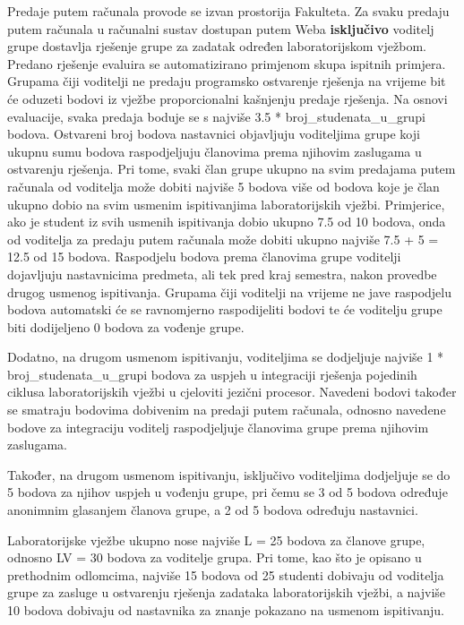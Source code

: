 \documentclass[times, 12pt, utf8]{book}
\begin{document}
Predaje putem računala provode se izvan prostorija Fakulteta.
Za svaku predaju putem računala u računalni sustav dostupan putem Weba \textbf{isključivo} voditelj grupe dostavlja rješenje grupe za zadatak određen laboratorijskom vježbom.
Predano rješenje evaluira se automatizirano primjenom skupa ispitnih primjera.
Grupama čiji voditelji ne predaju programsko ostvarenje rješenja na vrijeme bit će oduzeti bodovi iz vježbe proporcionalni kašnjenju predaje rješenja.
Na osnovi evaluacije, svaka predaja boduje se s najviše 3.5 * broj\_studenata\_u\_grupi bodova.
Ostvareni broj bodova nastavnici objavljuju voditeljima grupe koji ukupnu sumu bodova raspodjeljuju članovima prema njihovim zaslugama u ostvarenju rješenja.
Pri tome, svaki član grupe ukupno na svim predajama putem računala od voditelja može dobiti najviše 5 bodova više od bodova koje je član ukupno dobio na svim usmenim ispitivanjima laboratorijskih vježbi.
Primjerice, ako je student iz svih usmenih ispitivanja dobio ukupno 7.5 od 10 bodova, onda od voditelja za predaju putem računala može dobiti ukupno najviše 7.5 + 5 = 12.5 od 15 bodova. 
Raspodjelu bodova prema članovima grupe voditelji dojavljuju nastavnicima predmeta, ali tek pred kraj semestra, nakon provedbe drugog usmenog ispitivanja.
Grupama čiji voditelji na vrijeme ne jave raspodjelu bodova automatski će se ravnomjerno raspodijeliti bodovi te će voditelju grupe biti dodijeljeno 0 bodova za vođenje grupe.

Dodatno, na drugom usmenom ispitivanju, voditeljima se dodjeljuje najviše 1 * broj\_studenata\_u\_grupi bodova za uspjeh u integraciji rješenja pojedinih ciklusa laboratorijskih vježbi u cjeloviti jezični procesor.
Navedeni bodovi također se smatraju bodovima dobivenim na predaji putem računala, odnosno navedene bodove za integraciju voditelj raspodjeljuje članovima grupe prema njihovim zaslugama.

Također, na drugom usmenom ispitivanju, isključivo voditeljima dodjeljuje se do 5 bodova za njihov uspjeh u vođenju grupe, pri čemu se 3 od 5 bodova određuje anonimnim glasanjem članova grupe, a 2 od 5 bodova određuju nastavnici.

Laboratorijske vježbe ukupno nose najviše L = 25 bodova za članove grupe, odnosno LV = 30 bodova za voditelje grupa.
Pri tome, kao što je opisano u prethodnim odlomcima, najviše 15 bodova od 25 studenti dobivaju od voditelja grupe za zasluge u ostvarenju rješenja zadataka laboratorijskih vježbi, a najviše 10 bodova dobivaju od nastavnika za znanje pokazano na usmenom ispitivanju.
\end{document}
